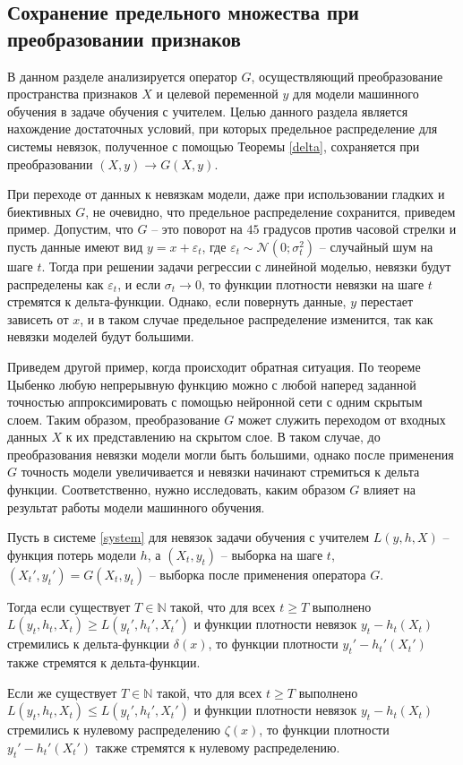     \subsection{Сохранение предельного множества при преобразовании признаков}

        В данном разделе анализируется оператор $G$, осуществляющий преобразование пространства признаков $X$ и целевой переменной $y$ для модели машинного обучения в задаче обучения с учителем. Целью данного раздела является нахождение достаточных условий, при которых предельное распределение для системы невязок, полученное с помощью Теоремы \ref{delta}, сохраняется при преобразовании $(X, y) \to G(X, y)$. 

        При переходе от данных к невязкам модели, даже при использовании гладких и биективных $G$, не очевидно, что предельное распределение сохранится, приведем пример. Допустим, что $G$ -- это поворот на $45$ градусов против часовой стрелки и пусть данные имеют вид $y = x + \varepsilon_t$, где  $\varepsilon_t \sim \mathcal{N}(0; \sigma_t^2)$ -- случайный шум на шаге $t$. Тогда при решении задачи регрессии с линейной моделью, невязки будут распределены как $\varepsilon_t$, и если $\sigma_t \to 0$, то функции плотности невязки на шаге $t$ стремятся к дельта-функции. Однако, если повернуть данные, $y$ перестает зависеть от $x$, и в таком случае предельное распределение изменится, так как невязки моделей будут большими. 

        Приведем другой пример, когда происходит обратная ситуация. По теореме Цыбенко \cite{cybenko1989approximation} любую непрерывную функцию можно с любой наперед заданной точностью аппроксимировать с помощью нейронной сети с одним скрытым слоем. Таким образом, преобразование $G$ может служить переходом от входных данных $X$ к их представлению на скрытом слое. В таком случае, до преобразования невязки модели могли быть большими, однако после применения $G$ точность модели увеличивается и невязки начинают стремиться к дельта функции. Соответственно, нужно исследовать, каким образом $G$ влияет на результат работы модели машинного обучения.

        \begin{lemma} \label{loss}
            Пусть в системе \eqref{system} для невязок задачи обучения с учителем $L(y, h, X)$ -- функция потерь модели $h$, а $(X_t, y_t)$ -- выборка на шаге $t$, $(X_t', y_t') = G(X_t, y_t)$ – выборка после применения оператора $G$. 
            
	        Тогда если существует $T \in \mathbb{N}$ такой, что для всех $t \geq T$ выполнено $L(y_t, h_t, X_t) \geq L(y_t', h_t', X_t')$ и функции плотности невязок $y_t - h_t(X_t)$ стремились к дельта-функции $\delta(x)$, то функции плотности $y_t' - h_t'(X_t')$ также стремятся к дельта-функции. 
         
	        Если же существует $T \in \mathbb{N}$ такой, что для всех $t \geq T$ выполнено $L(y_t, h_t, X_t) \leq L(y_t', h_t', X_t')$ и функции плотности невязок $y_t - h_t(X_t)$ стремились к нулевому распределению $\zeta(x)$, то функции плотности $y_t' - h_t'(X_t')$ также стремятся к нулевому распределению. 
        \end{lemma}

